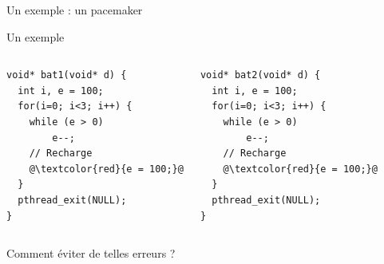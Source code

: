 \documentclass{beamer}
\begin{document}
\begin{frame}{Un exemple : un pacemaker}
  \begin{center}
  \end{center}

\end{frame}

\begin{frame}[fragile]{Un exemple}
\begin{columns}[onlytextwidth, T]
\begin{lstlisting}[caption=Thread 1, frame=single]
void* bat1(void* d) {
  int i, e = 100;
  for(i=0; i<3; i++) {
    while (e > 0)
        e--;
    // Recharge
    @\textcolor{red}{e = 100;}@
  }
  pthread_exit(NULL);
}
\end{lstlisting}

\begin{lstlisting}[frame=single, caption=Thread 2]
void* bat2(void* d) {
  int i, e = 100;
  for(i=0; i<3; i++) {
    while (e > 0)
        e--;
    // Recharge
    @\textcolor{red}{e = 100;}@
  }
  pthread_exit(NULL);
}
\end{lstlisting}
\end{columns}
\end{frame}

\begin{frame}[standout]
  Comment éviter de telles erreurs ?
\end{frame}
\end{document}
